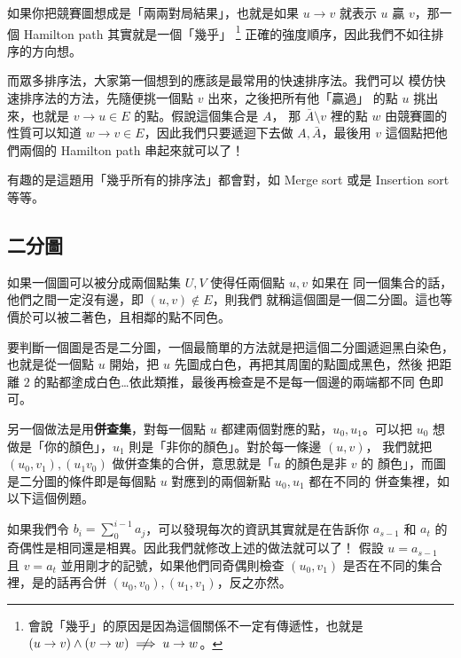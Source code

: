 \documentclass[a4paper,12pt]{book}
\begin{document}
如果你把競賽圖想成是「兩兩對局結果」，也就是如果 $u \to v$
就表示 $u$ 贏 $v$，那一個 Hamilton path 其實就是一個「幾乎」
\footnote{會說「幾乎」的原因是因為這個關係不一定有傳遞性，也就是
$(u \to v) \land (v \to w) \centernot\implies u \to w$。}
正確的強度順序，因此我們不如往排序的方向想。

而眾多排序法，大家第一個想到的應該是最常用的快速排序法。我們可以
模仿快速排序法的方法，先隨便挑一個點 $v$ 出來，之後把所有他「贏過」
的點 $u$ 挑出來，也就是 $v \to u \in E$ 的點。假說這個集合是 $A$，
那 $\bar{A} \setminus v$ 裡的點 $w$ 由競賽圖的性質可以知道 
$w \to v \in E$，因此我們只要遞迴下去做 $A, \bar{A}$，最後用
$v$ 這個點把他們兩個的 Hamilton path 串起來就可以了！

有趣的是這題用「幾乎所有的排序法」都會對，如 Merge sort 或是 
Insertion sort 等等。

\subsection{二分圖}
如果一個圖可以被分成兩個點集 $U, V$ 使得任兩個點 $u, v$ 如果在
同一個集合的話，他們之間一定沒有邊，即 $(u, v) \notin E$，則我們
就稱這個圖是一個二分圖。這也等價於可以被二著色，且相鄰的點不同色。

要判斷一個圖是否是二分圖，一個最簡單的方法就是把這個二分圖遞迴黑白染色，
也就是從一個點 $u$ 開始，把 $u$ 先圖成白色，再把其周圍的點圖成黑色，然後
把距離 $2$ 的點都塗成白色…依此類推，最後再檢查是不是每一個邊的兩端都不同
色即可。

另一個做法是用{\bf 併查集}，對每一個點 $u$ 都建兩個對應的點，$u_0, u_1$。可以把
$u_0$ 想做是「你的顏色」，$u_1$ 則是「非你的顏色」。對於每一條邊 $(u, v)$，
我們就把 $(u_0, v_1), (u_1 v_0)$ 做併查集的合併，意思就是「$u$ 的顏色是非 $v$ 的
顏色」，而圖是二分圖的條件即是每個點 $u$ 對應到的兩個新點 $u_0, u_1$ 都在不同的
併查集裡，如以下這個例題。


如果我們令 $b_i = \sum\limits_{0}^{i-1} a_j$，可以發現每次的資訊其實就是在告訴你
$a_{s-1}$ 和 $a_t$ 的奇偶性是相同還是相異。因此我們就修改上述的做法就可以了！
假設 $u = a_{s-1}$ 且 $v = a_t$ 並用剛才的記號，如果他們同奇偶則檢查 $(u_0, v_1)$
是否在不同的集合裡，是的話再合併 $(u_0, v_0), (u_1, v_1)$，反之亦然。
\end{document}
